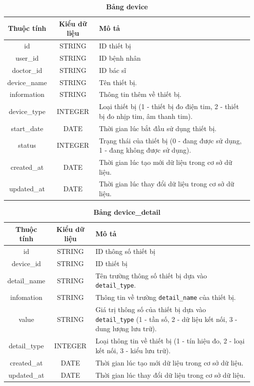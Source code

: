 \begin{table}[H]
  \caption{\bfseries \fontsize{12pt}{0pt}\selectfont Bảng device}
  \centering
  \begin{tabularx}{\textwidth}{|c|c|X|}
    \hline
    \textbf{Thuộc tính} & \textbf{Kiểu dữ liệu} & \textbf{Mô tả} \\
    \hline
    id & STRING & ID thiết bị  \\
    \hline
    user\_id & STRING & ID bệnh nhân  \\
    \hline
    doctor\_id & STRING & ID bác sĩ  \\
    \hline
    device\_name & STRING & Tên thiết bị. \\
    \hline
    information & STRING & Thông tin thêm về thiết bị. \\
    \hline
    device\_type & INTEGER & Loại thiết bị (1 - thiết bị đo điện tim, 2 - thiết bị đo nhịp tim, âm thanh tim). \\
    \hline
    start\_date & DATE & Thời gian lúc bắt đầu sử dụng thiết bị. \\
    \hline
    status & INTEGER & Trạng thái của thiết bị (0 - đang được sử dụng, 1 - đang không được sử dụng). \\
    \hline
    created\_at & DATE & Thời gian lúc tạo mới dữ liệu trong cơ sở dữ liệu. \\
    \hline
    updated\_at & DATE & Thời gian lúc thay đổi dữ liệu trong cơ sở dữ liệu. \\
    \hline
  \end{tabularx}
\end{table}


\begin{table}[H]
  \caption{\bfseries \fontsize{12pt}{0pt}\selectfont Bảng device\_detail}
  \centering
  \begin{tabularx}{\textwidth}{|c|c|X|}
    \hline
    \textbf{Thuộc tính} & \textbf{Kiểu dữ liệu} & \textbf{Mô tả} \\
    \hline
    id & STRING & ID thông số thiết bị  \\
    \hline
    device\_id & STRING & ID thiết bị  \\
    \hline
    detail\_name & STRING & Tên trường thông số thiết bị dựa vào \texttt{detail\_type}. \\
    \hline
    infomation & STRING & Thông tin về trường \texttt{detail\_name} của thiết bị. \\
    \hline
    value & STRING & Giá trị thông số của thiết bị dựa vào \texttt{detail\_type} (1 - tần số, 2 - dữ liệu kết nối, 3 - dung lượng lưu trữ). \\
    \hline
    detail\_type & INTEGER & Loại thông tin về thiết bị (1 - tín hiệu đo, 2 - loại kết nối, 3 - kiểu lưu trữ). \\
    \hline
    created\_at & DATE & Thời gian lúc tạo mới dữ liệu trong cơ sở dữ liệu. \\
    \hline
    updated\_at & DATE & Thời gian lúc thay đổi dữ liệu trong cơ sở dữ liệu. \\
    \hline
  \end{tabularx}
\end{table}

